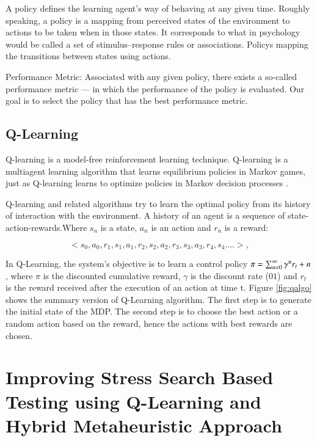 \documentclass{bmcart}
\begin{document}
A policy defines the learning agent’s way of behaving at any given time. Roughly speaking, a policy is a mapping from perceived states of the environment
to actions to be taken when in those states. It corresponds to what in
psychology would be called a set of stimulus–response rules or associations.  Policys mapping the transitions between states using actions.

Performance Metric: Associated with any given policy, there exists a so-called performance
metric — in which the performance of the policy is evaluated. Our goal is to select the policy
that has the best performance metric. 


\subsection{Q-Learning}

Q-learning is a model-free reinforcement learning technique. Q-learning is a multiagent learning algorithm that learns equilibrium policies in Markov games, just as Q-learning learns to optimize policies in Markov decision processes \citep{Greenwald2003}. 

Q-learning and related algorithms try to learn the optimal policy from its history of interaction with the environment. A history of an agent is a sequence of state-action-rewards.Where $s_{n}$ is a state, $a_{n}$ is an action and $r_{n}$ is a reward:

\begin{equation}
<s_{0},a_{0},r_{1},s_{1},a_{1},r_{2},s_{2},a_{2},r_{3},s_{3},a_{3},r_{4},s_{4}....>,
\end{equation}


In Q-Learning, the system's objective is to learn a control policy $\pi = \sum_{n=0}^{\infty} \gamma\textsuperscript{n}  r_{t}+n $, where $\pi$  is the discounted cumulative reward, $\gamma$ is the discount rate ($01$) and $r_{t}$ is the reward received after  the execution of an action at time t. Figure \ref{fig:qalgo} shows the summary version of Q-Learning algorithm. The first step is to generate the initial state of the MDP. The second step is to choose the best action or a random action based on the reward, hence the actions with best rewards are chosen.


\section{Improving Stress Search Based Testing using Q-Learning and Hybrid Metaheuristic Approach}
\end{document}
